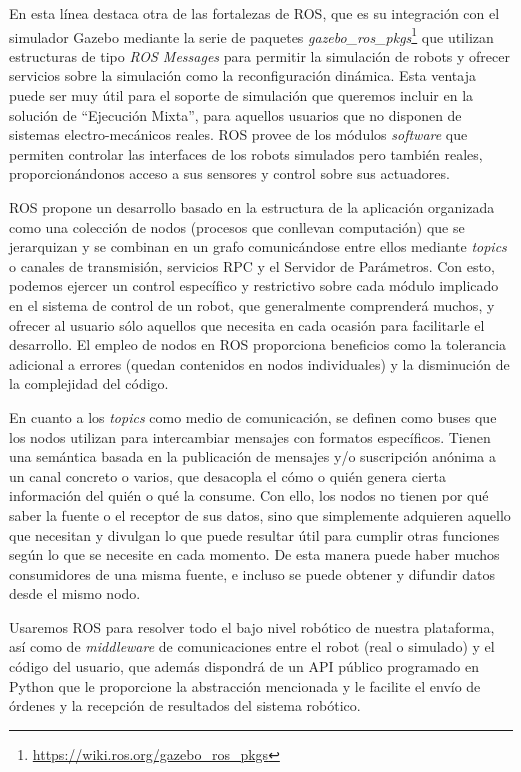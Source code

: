 En esta línea destaca otra de las fortalezas de ROS, que es su integración con el simulador Gazebo mediante la serie de paquetes \textit{gazebo\_ros\_pkgs}\footnote{\url{https://wiki.ros.org/gazebo\_ros\_pkgs}} que utilizan estructuras de tipo \textit{ROS Messages} para permitir la simulación de robots y  ofrecer servicios sobre la simulación como la reconfiguración dinámica. Esta ventaja puede ser muy útil para el soporte de simulación que queremos incluir en la solución de ``Ejecución Mixta'', para aquellos usuarios que no disponen de sistemas electro-mecánicos reales. ROS provee de los módulos \textit{software} que permiten controlar las interfaces de los robots simulados pero también reales, proporcionándonos acceso a sus sensores y control sobre sus actuadores.

ROS propone un desarrollo basado en la estructura de la aplicación organizada como una colección de nodos (procesos que conllevan computación) que se jerarquizan y se combinan en un grafo comunicándose entre ellos mediante \textit{topics} o canales de transmisión, servicios RPC y el Servidor de
Parámetros. Con esto, podemos ejercer un control específico y restrictivo sobre cada módulo implicado en el sistema de control de un robot, que generalmente comprenderá muchos, y ofrecer al usuario sólo aquellos que necesita en cada ocasión para facilitarle el desarrollo. El empleo de nodos en ROS proporciona  beneficios como la tolerancia adicional a errores (quedan contenidos en nodos individuales) y la disminución de la complejidad del código.

En cuanto a los \textit{topics} como medio de comunicación, se definen como buses que los nodos utilizan para intercambiar mensajes con formatos específicos. Tienen una semántica  basada en la publicación de mensajes y/o suscripción anónima a un canal concreto o varios, que desacopla el cómo o quién genera cierta información del quién o qué la consume. Con ello, los nodos no tienen por qué saber la fuente o el receptor de sus datos, sino que simplemente adquieren aquello que necesitan y divulgan lo que puede resultar útil para cumplir otras funciones según lo que se necesite en cada momento. De esta manera puede haber muchos consumidores de una misma fuente, e incluso se puede obtener y difundir datos desde el mismo nodo.

Usaremos ROS para resolver todo el bajo nivel robótico de nuestra plataforma, así como de \textit{middleware} de comunicaciones entre el robot (real o simulado) y el código del usuario, que además dispondrá de un API público programado en Python que le proporcione la abstracción mencionada y le facilite el envío de órdenes y la recepción de resultados del sistema robótico.


